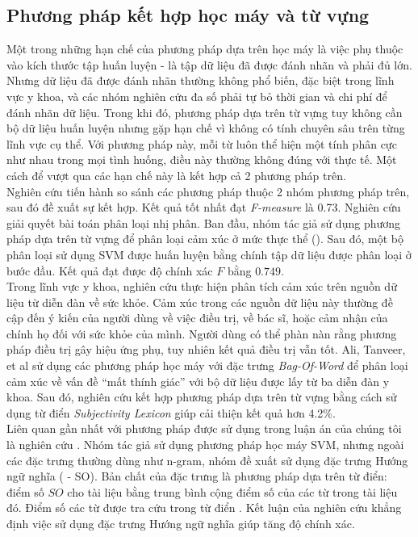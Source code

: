 \subsection{Phương pháp kết hợp học máy và từ vựng}
Một trong những hạn chế của phương pháp dựa trên học máy là việc phụ thuộc vào kích thước tập huấn luyện - là tập dữ liệu đã được đánh nhãn và phải đủ lớn. Nhưng dữ liệu đã được đánh nhãn thường không phổ biến, đặc biệt trong lĩnh vực y khoa, và các nhóm nghiên cứu đa số phải tự bỏ thời gian và chi phí để đánh nhãn dữ liệu. Trong khi đó, phương pháp dựa trên từ vựng tuy không cần bộ dữ liệu huấn luyện nhưng gặp hạn chế vì không có tính chuyên sâu trên từng lĩnh vực cụ thể. Với phương pháp này, mỗi từ luôn thể hiện một tính phân cực như nhau trong mọi tình huống, điều này thường không đúng với thực tế. Một cách để vượt qua các hạn chế này là kết hợp cả 2 phương pháp trên.\\

Nghiên cứu \cite{gonccalves2013comparing} tiến hành so sánh các phương pháp thuộc 2 nhóm phương pháp trên, sau đó đề xuất sự kết hợp. Kết quả tốt nhất đạt \textit{F-measure} là 0.73. Nghiên cứu \cite{Zhang2011} giải quyết bài toán phân loại nhị phân. Ban đầu, nhóm tác giả sử dụng phương pháp dựa trên từ vựng để phân loại cảm xúc ở mức thực thể (). Sau đó, một bộ phân loại sử dụng SVM được huấn luyện bằng chính tập dữ liệu được phân loại ở bước đầu. Kết quả đạt được độ chính xác $F$ bằng $0.749$.\\

Trong lĩnh vực y khoa, nghiên cứu \cite{ali2013can} thực hiện phân tích cảm xúc trên nguồn dữ liệu từ diễn đàn về sức khỏe. Cảm xúc trong các nguồn dữ liệu này thường đề cập đến ý kiến của người dùng về việc điều trị, về bác sĩ, hoặc cảm nhận của chính họ đối với sức khỏe của mình. Người dùng có thể phàn nàn rằng phương pháp điều trị gây hiệu ứng phụ, tuy nhiên kết quả điều trị vẫn tốt. Ali, Tanveer, et al \cite{ali2013can} sử dụng các phương pháp học máy với đặc trưng \textit{Bag-Of-Word} để phân loại cảm xúc về vấn đề ``mất thính giác'' với bộ dữ liệu được lấy từ ba diễn đàn y khoa\footnotemark. Sau đó, nghiên cứu kết hợp phương pháp dựa trên từ vựng bằng cách sử dụng từ điển \textit{Subjectivity Lexicon} giúp cải thiện kết quả hơn 4.2\%. \\

Liên quan gần nhất với phương pháp được sử dụng trong luận án của chúng tôi là nghiên cứu \cite{sarker2011outcome}. Nhóm tác giả sử dụng phương pháp học máy SVM, nhưng ngoài các đặc trưng thường dùng như n-gram, nhóm đề xuất sử dụng đặc trưng Hướng ngữ nghĩa ( - SO). Bản chất của đặc trưng là phương pháp dựa trên từ điển: điểm số $SO$ cho tài liệu bằng trung bình cộng điểm số của các từ trong tài liệu đó. Điểm số các từ được tra cứu trong từ điển . Kết luận của nghiên cứu khẳng định việc sử dụng đặc trưng Hướng ngữ nghĩa giúp tăng độ chính xác.